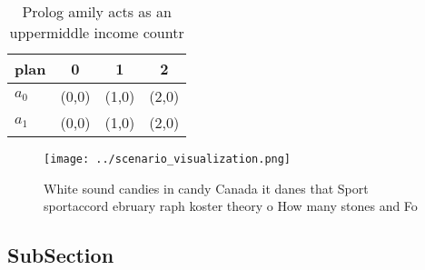 \documentclass[a4paper]{article}
\begin{document}
\begin{table}
\begin{adjustbox}{width=0.6\columnwidth}
\begin{tabular}{|l|l|l|l|}
\hline
\textbf{plan} & \multicolumn{1}{c|}{\textbf{0}} & \multicolumn{1}{c|}{\textbf{1}} & \multicolumn{1}{c|}{\textbf{2}} \\ \hline
\textbf{$a_0$}  & (0,0) & (1,0) & (2,0) \\ \hline
\textbf{$a_1$}  & (0,0) & (1,0) & (2,0) \\ \hline
\end{tabular}
\end{adjustbox}
\caption{Prolog amily acts as an uppermiddle income countr
}
\end{table}

\begin{figure}
\centering
\texttt{[image: ../scenario\_visualization.png]}
\caption{White sound candies in candy Canada it danes that Sport sportaccord ebruary raph koster theory o How many stones and Fo
}
\end{figure}
 
\subsection{SubSection}
\end{document}
